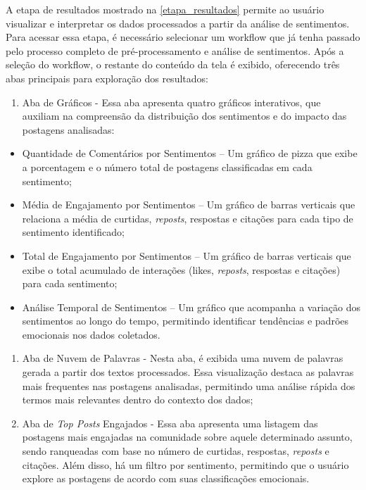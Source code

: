 \documentclass[
	12pt,				%
	oneside,			%
	a4paper,			%
	english,			%
	french,				%
	spanish,			%
	brazil				%
	]{abntex2}
\begin{document}
A etapa de resultados mostrado na \autoref{etapa_resultados} permite ao
usuário visualizar e interpretar os dados processados a partir da
análise de sentimentos. Para acessar essa etapa, é necessário selecionar
um workflow que já tenha passado pelo processo completo de
pré-processamento e análise de sentimentos. Após a seleção do workflow,
o restante do conteúdo da tela é exibido, oferecendo três abas
principais para exploração dos resultados:

\begin{enumerate}
\def\labelenumi{\arabic{enumi})}
\tightlist
\item
  Aba de Gráficos - Essa aba apresenta quatro gráficos interativos, que
  auxiliam na compreensão da distribuição dos sentimentos e do impacto
  das postagens analisadas:
\end{enumerate}

\begin{itemize}
\tightlist
\item
  Quantidade de Comentários por Sentimentos -- Um gráfico de pizza que
  exibe a porcentagem e o número total de postagens classificadas em
  cada sentimento;
\item
  Média de Engajamento por Sentimentos -- Um gráfico de barras verticais
  que relaciona a média de curtidas, \emph{reposts}, respostas e
  citações para cada tipo de sentimento identificado;
\item
  Total de Engajamento por Sentimentos -- Um gráfico de barras verticais
  que exibe o total acumulado de interações (likes, \emph{reposts},
  respostas e citações) para cada sentimento;
\item
  Análise Temporal de Sentimentos -- Um gráfico que acompanha a variação
  dos sentimentos ao longo do tempo, permitindo identificar tendências e
  padrões emocionais nos dados coletados.
\end{itemize}

\begin{enumerate}
\def\labelenumi{\arabic{enumi})}
\item
  Aba de Nuvem de Palavras - Nesta aba, é exibida uma nuvem de palavras
  gerada a partir dos textos processados. Essa visualização destaca as
  palavras mais frequentes nas postagens analisadas, permitindo uma
  análise rápida dos termos mais relevantes dentro do contexto dos
  dados;
\item
  Aba de \emph{Top Posts} Engajados - Essa aba apresenta uma listagem
  das postagens mais engajadas na comunidade sobre aquele determinado
  assunto, sendo ranqueadas com base no número de curtidas, respostas,
  \emph{reposts} e citações. Além disso, há um filtro por sentimento,
  permitindo que o usuário explore as postagens de acordo com suas
  classificações emocionais.
\end{enumerate}
\end{document}
